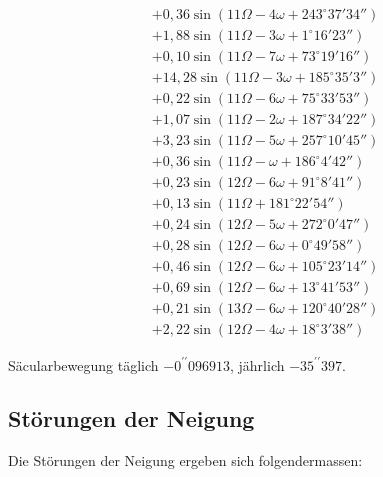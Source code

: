 \documentclass[10pt,a4paper]{article}
\begin{document}
\begin{align*}
&+ 0,36 \sin(11\Omega - 4\omega + 243^{\circ}37'34'') \\
&+ 1,88 \sin(11\Omega - 3\omega + 1^{\circ}16'23'') \\
&+ 0,10 \sin(11\Omega - 7\omega + 73^{\circ}19'16'') \\
&+ 14,28 \sin(11\Omega - 3\omega + 185^{\circ}35'3'') \\
&+ 0,22 \sin(11\Omega - 6\omega + 75^{\circ}33'53'') \\
&+ 1,07 \sin(11\Omega - 2\omega + 187^{\circ}34'22'') \\
&+ 3,23 \sin(11\Omega - 5\omega + 257^{\circ}10'45'') \\
&+ 0,36 \sin(11\Omega - \omega + 186^{\circ}4'42'') \\
&+ 0,23 \sin(12\Omega - 6\omega + 91^{\circ}8'41'') \\
&+ 0,13 \sin(11\Omega + 181^{\circ}22'54'') \\
&+ 0,24 \sin(12\Omega - 5\omega + 272^{\circ}0'47'') \\
&+ 0,28 \sin(12\Omega - 6\omega + 0^{\circ}49'58'') \\
&+ 0,46 \sin(12\Omega - 6\omega + 105^{\circ}23'14'') \\
&+ 0,69 \sin(12\Omega - 6\omega + 13^{\circ}41'53'') \\
&+ 0,21 \sin(13\Omega - 6\omega + 120^{\circ}40'28'') \\
&+ 2,22 \sin(12\Omega - 4\omega + 18^{\circ}3'38'')
\end{align*}

Säcularbewegung täglich $-0^{\prime\prime}096913$, jährlich $-35^{\prime\prime}397$.

\newpage
\subsection*{Störungen der Neigung}

Die Störungen der Neigung ergeben sich folgendermassen:
\end{document}
